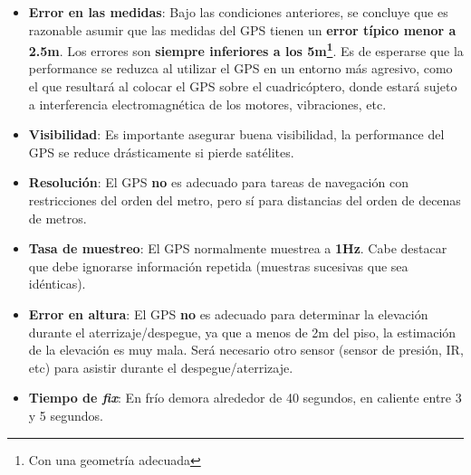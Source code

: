 \documentclass[main]{subfiles}
\begin{document}
\begin{itemize}
\item \textbf{Error en las medidas}: Bajo las condiciones anteriores, se concluye que es razonable asumir que las medidas del GPS tienen un \textbf{error t\'ipico menor a 2.5m}. Los errores son \textbf{siempre inferiores a los 5m\footnote{Con una geometr\'ia adecuada}}. Es de esperarse que la performance se reduzca al utilizar el GPS en un entorno más agresivo, como el que resultará al colocar el GPS sobre el cuadricóptero, donde estará sujeto a  interferencia electromagnética de los motores, vibraciones, etc.
\item \textbf{Visibilidad}: Es importante asegurar buena visibilidad, la performance del GPS se reduce drásticamente si pierde satélites.
\item \textbf{Resolución}: El GPS \textbf{no} es adecuado para tareas de navegación con restricciones del orden del metro, pero sí para distancias del orden de decenas de metros.
\item \textbf{Tasa de muestreo}: El GPS normalmente muestrea a \textbf{1Hz}. Cabe destacar que debe ignorarse información repetida (muestras sucesivas que sea idénticas).
\item \textbf{Error en altura}: El GPS \textbf{no} es adecuado para determinar la elevación durante el aterrizaje/despegue, ya que a menos de 2m del piso, la estimación de la elevación es muy mala. Será necesario otro sensor (sensor de presión, IR, etc) para asistir durante el despegue/aterrizaje.
\item \textbf{Tiempo de \textit{fix}}: En frío demora alrededor de 40 segundos, en caliente entre 3 y 5 segundos.
\end{itemize}
\end{document}
